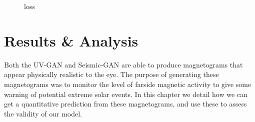 \documentclass[11pt,a4paper,onecolumn]{report}
\begin{document}
\begin{figure}[htbp]
  \centering
  
  \caption{loss}
  \label{fig:seismic_loss}
\end{figure}

%
%
%
%
%
%
%
%
\chapter{Results \& Analysis}
%
%
%
%
%
%
\label{chap:results_and_analysis}

Both the UV-GAN and Seismic-GAN are able to produce magnetograms that appear
physically realistic to the eye. The purpose of generating these magnetograms was
to monitor the level of farside magnetic activity to give some warning of
potential extreme solar events. In this chapter we detail how we can get a
quantitative prediction from these magnetograms, and use these to assess the
validity of our model. 
\end{document}
